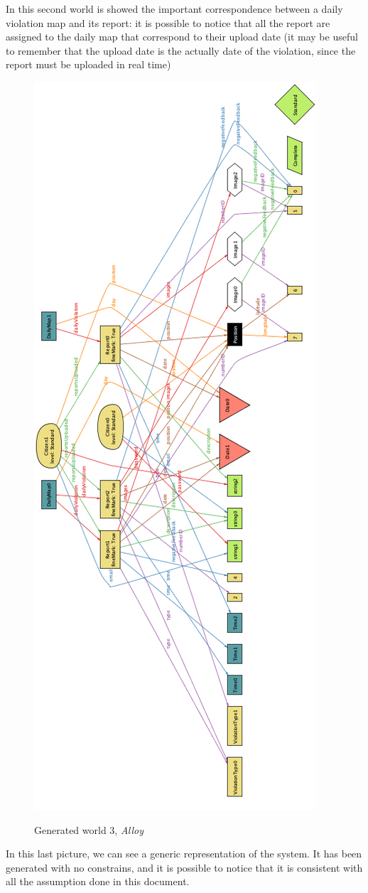 \documentclass[../RASD.tex]{subfiles}
\begin{document}
    In this second world is showed the important correspondence between a daily violation map and its report:
    it is possible to notice that all the report are assigned to the daily map that correspond to their upload date (it may be useful to remember that the upload date is the actually date of the violation, since the report must be uploaded in real time)

    \begin{figure}[H]
        \centering
        \includegraphics[scale = 0.95]{assets/world3.png}\\[1.6 cm]
        \caption[Generated world 3, \textit{Alloy}]{Generated world 3, \textit{Alloy}}
    \end{figure}

    In this last picture, we can see a generic representation of the system.
    It has been generated with no constrains, and it is possible to notice that it is consistent with all the assumption done in this document.
\end{document}
